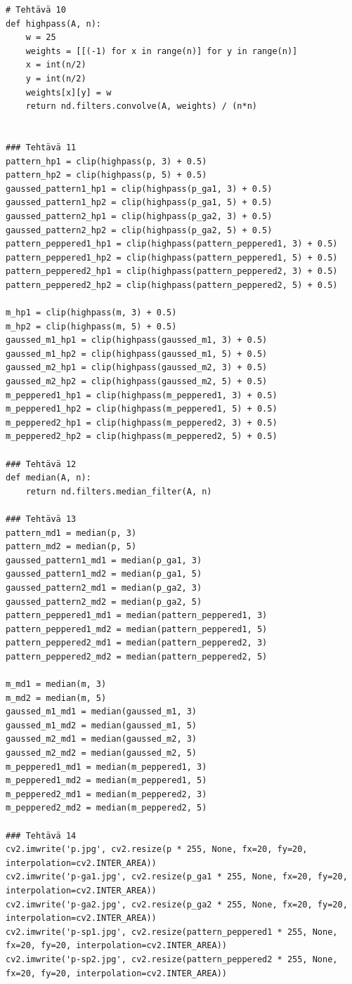 \documentclass{article}
\begin{document}
\begin{verbatim}
# Tehtävä 10
def highpass(A, n):
    w = 25
    weights = [[(-1) for x in range(n)] for y in range(n)]
    x = int(n/2)
    y = int(n/2)
    weights[x][y] = w 
    return nd.filters.convolve(A, weights) / (n*n)


### Tehtävä 11
pattern_hp1 = clip(highpass(p, 3) + 0.5)
pattern_hp2 = clip(highpass(p, 5) + 0.5)
gaussed_pattern1_hp1 = clip(highpass(p_ga1, 3) + 0.5)
gaussed_pattern1_hp2 = clip(highpass(p_ga1, 5) + 0.5)
gaussed_pattern2_hp1 = clip(highpass(p_ga2, 3) + 0.5)
gaussed_pattern2_hp2 = clip(highpass(p_ga2, 5) + 0.5)
pattern_peppered1_hp1 = clip(highpass(pattern_peppered1, 3) + 0.5)
pattern_peppered1_hp2 = clip(highpass(pattern_peppered1, 5) + 0.5)
pattern_peppered2_hp1 = clip(highpass(pattern_peppered2, 3) + 0.5)
pattern_peppered2_hp2 = clip(highpass(pattern_peppered2, 5) + 0.5)

m_hp1 = clip(highpass(m, 3) + 0.5)
m_hp2 = clip(highpass(m, 5) + 0.5)
gaussed_m1_hp1 = clip(highpass(gaussed_m1, 3) + 0.5)
gaussed_m1_hp2 = clip(highpass(gaussed_m1, 5) + 0.5)
gaussed_m2_hp1 = clip(highpass(gaussed_m2, 3) + 0.5)
gaussed_m2_hp2 = clip(highpass(gaussed_m2, 5) + 0.5)
m_peppered1_hp1 = clip(highpass(m_peppered1, 3) + 0.5)
m_peppered1_hp2 = clip(highpass(m_peppered1, 5) + 0.5)
m_peppered2_hp1 = clip(highpass(m_peppered2, 3) + 0.5) 
m_peppered2_hp2 = clip(highpass(m_peppered2, 5) + 0.5) 

### Tehtävä 12
def median(A, n):
    return nd.filters.median_filter(A, n)

### Tehtävä 13
pattern_md1 = median(p, 3)
pattern_md2 = median(p, 5)
gaussed_pattern1_md1 = median(p_ga1, 3)
gaussed_pattern1_md2 = median(p_ga1, 5)
gaussed_pattern2_md1 = median(p_ga2, 3)
gaussed_pattern2_md2 = median(p_ga2, 5)
pattern_peppered1_md1 = median(pattern_peppered1, 3) 
pattern_peppered1_md2 = median(pattern_peppered1, 5) 
pattern_peppered2_md1 = median(pattern_peppered2, 3) 
pattern_peppered2_md2 = median(pattern_peppered2, 5) 

m_md1 = median(m, 3)
m_md2 = median(m, 5)
gaussed_m1_md1 = median(gaussed_m1, 3)
gaussed_m1_md2 = median(gaussed_m1, 5)
gaussed_m2_md1 = median(gaussed_m2, 3)
gaussed_m2_md2 = median(gaussed_m2, 5)
m_peppered1_md1 = median(m_peppered1, 3) 
m_peppered1_md2 = median(m_peppered1, 5) 
m_peppered2_md1 = median(m_peppered2, 3) 
m_peppered2_md2 = median(m_peppered2, 5) 

### Tehtävä 14
cv2.imwrite('p.jpg', cv2.resize(p * 255, None, fx=20, fy=20, interpolation=cv2.INTER_AREA))
cv2.imwrite('p-ga1.jpg', cv2.resize(p_ga1 * 255, None, fx=20, fy=20, interpolation=cv2.INTER_AREA))
cv2.imwrite('p-ga2.jpg', cv2.resize(p_ga2 * 255, None, fx=20, fy=20, interpolation=cv2.INTER_AREA))
cv2.imwrite('p-sp1.jpg', cv2.resize(pattern_peppered1 * 255, None, fx=20, fy=20, interpolation=cv2.INTER_AREA))
cv2.imwrite('p-sp2.jpg', cv2.resize(pattern_peppered2 * 255, None, fx=20, fy=20, interpolation=cv2.INTER_AREA))


\end{verbatim}
\end{document}
